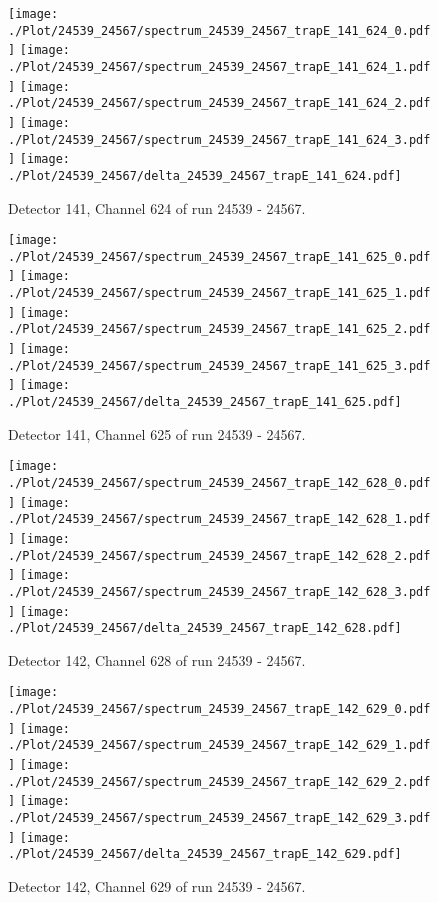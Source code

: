 \clearpage
\begin{figure}[hb]
\centering
\texttt{[image: ./Plot/24539\_24567/spectrum\_24539\_24567\_trapE\_141\_624\_0.pdf]}
\texttt{[image: ./Plot/24539\_24567/spectrum\_24539\_24567\_trapE\_141\_624\_1.pdf]}
\texttt{[image: ./Plot/24539\_24567/spectrum\_24539\_24567\_trapE\_141\_624\_2.pdf]}
\texttt{[image: ./Plot/24539\_24567/spectrum\_24539\_24567\_trapE\_141\_624\_3.pdf]}
\texttt{[image: ./Plot/24539\_24567/delta\_24539\_24567\_trapE\_141\_624.pdf]}
\caption{ Detector 141, Channel 624 of run 24539 - 24567.}
\label{fig:24539_24567_trapE_141_624}
\end{figure}
\clearpage
\begin{figure}[hb]
\centering
\texttt{[image: ./Plot/24539\_24567/spectrum\_24539\_24567\_trapE\_141\_625\_0.pdf]}
\texttt{[image: ./Plot/24539\_24567/spectrum\_24539\_24567\_trapE\_141\_625\_1.pdf]}
\texttt{[image: ./Plot/24539\_24567/spectrum\_24539\_24567\_trapE\_141\_625\_2.pdf]}
\texttt{[image: ./Plot/24539\_24567/spectrum\_24539\_24567\_trapE\_141\_625\_3.pdf]}
\texttt{[image: ./Plot/24539\_24567/delta\_24539\_24567\_trapE\_141\_625.pdf]}
\caption{ Detector 141, Channel 625 of run 24539 - 24567.}
\label{fig:24539_24567_trapE_141_625}
\end{figure}
\clearpage
\begin{figure}[hb]
\centering
\texttt{[image: ./Plot/24539\_24567/spectrum\_24539\_24567\_trapE\_142\_628\_0.pdf]}
\texttt{[image: ./Plot/24539\_24567/spectrum\_24539\_24567\_trapE\_142\_628\_1.pdf]}
\texttt{[image: ./Plot/24539\_24567/spectrum\_24539\_24567\_trapE\_142\_628\_2.pdf]}
\texttt{[image: ./Plot/24539\_24567/spectrum\_24539\_24567\_trapE\_142\_628\_3.pdf]}
\texttt{[image: ./Plot/24539\_24567/delta\_24539\_24567\_trapE\_142\_628.pdf]}
\caption{ Detector 142, Channel 628 of run 24539 - 24567.}
\label{fig:24539_24567_trapE_142_628}
\end{figure}
\clearpage
\begin{figure}[hb]
\centering
\texttt{[image: ./Plot/24539\_24567/spectrum\_24539\_24567\_trapE\_142\_629\_0.pdf]}
\texttt{[image: ./Plot/24539\_24567/spectrum\_24539\_24567\_trapE\_142\_629\_1.pdf]}
\texttt{[image: ./Plot/24539\_24567/spectrum\_24539\_24567\_trapE\_142\_629\_2.pdf]}
\texttt{[image: ./Plot/24539\_24567/spectrum\_24539\_24567\_trapE\_142\_629\_3.pdf]}
\texttt{[image: ./Plot/24539\_24567/delta\_24539\_24567\_trapE\_142\_629.pdf]}
\caption{ Detector 142, Channel 629 of run 24539 - 24567.}
\label{fig:24539_24567_trapE_142_629}
\end{figure}
